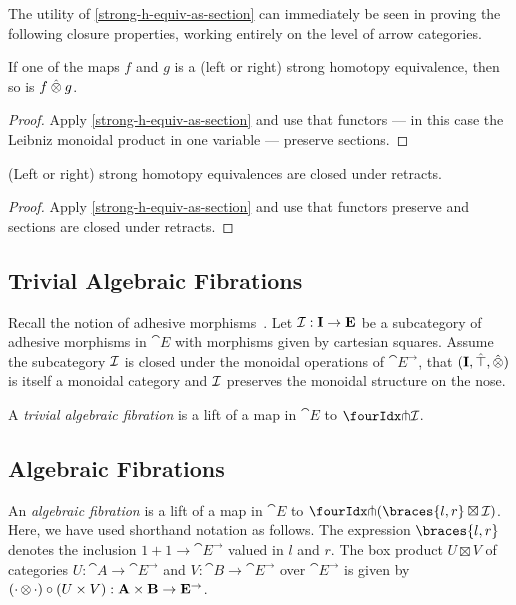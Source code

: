 \documentclass[reqno,10pt,a4paper,oneside]{amsart}
\begin{document}
The utility of \cref{strong-h-equiv-as-section} can immediately be seen in proving the following closure properties, working entirely on the level of arrow categories.

\begin{proposition}
\label{strong-h-equiv-closed-under-monoidal-prod}
If one of the maps $f$ and $g$ is a (left or right) strong homotopy equivalence, then so is $f \hatotimes g$.
\end{proposition}

\begin{proof}
Apply \cref{strong-h-equiv-as-section} and use that functors --- in this case the Leibniz monoidal product in one variable --- preserve sections.
\end{proof}

\begin{proposition}
\label{strong-h-equiv-closed-under-retract}
(Left or right) strong homotopy equivalences are closed under retracts.
\end{proposition}

\begin{proof}
Apply \cref{strong-h-equiv-as-section} and use that functors preserve and sections are closed under retracts.
\end{proof}

\subsection{Trivial Algebraic Fibrations}

Recall the notion of adhesive morphisms~\cite{garner-lack:adhesive}.
Let $\cal{I} : \cat{I} \to \cat{E}$ be a subcategory of adhesive morphisms in $\cat{E}$ with morphisms given by cartesian squares.
Assume the subcategory $\cal{I}$ is closed under the monoidal operations of $\cat{E}^{\to}$, \ie that $(\cat{I}, \hatunit, \hatotimes)$ is itself a monoidal category and $\cal{I}$ preserves the monoidal structure on the nose.

A \emph{trivial algebraic fibration} is a lift of a map in $\cat{E}$ to $\liftr{\cal{I}}$.

\subsection{Algebraic Fibrations}

An \emph{algebraic fibration} is a lift of a map in $\cat{E}$ to $\liftr{(\braces{\intervall, \intervalr} \boxtimes \cal{I})}$.
Here, we have used shorthand notation as follows.
The expression $\braces{l, r}$ denotes the inclusion $1 + 1 \to \cat{E}^{\to}$ valued in $l$ and $r$.
The box product $U \boxtimes V$ of categories $U : \cat{A} \to \cat{E}^{\to}$ and $V : \cat{B} \to \cat{E}^{\to}$ over $\cat{E}^{\to}$ is given by $(\arghole \otimes \arghole) \cc (U \times V) : \cat{A} \times \cat{B} \to \cat{E}^{\to}$.
\end{document}
